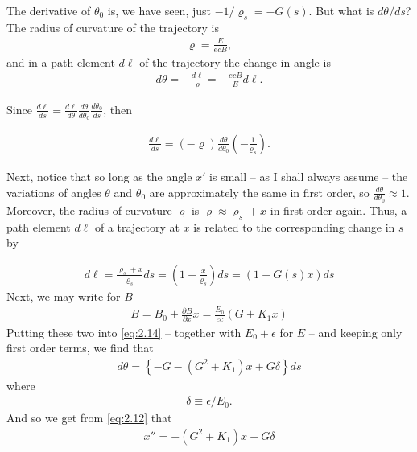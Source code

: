 The derivative of $\theta_0$ is, we have seen, just $-1/\varrho_s = -G(s)$. But what is $d\theta/ds$? The radius of curvature of the trajectory is
\begin{align} \label{eq:2.13}
	\varrho = \frac{E}{ecB},
\end{align}
and in a path element $d\ell$ of the trajectory the change in angle is
\begin{align}
	d\theta = -\frac{d\ell}{\varrho} = -\frac{ecB}{E}d\ell\label{eq:2.14}.
\end{align}

Since $\frac{d\ell}{ds} = \frac{d\ell}{d\theta}\frac{d\theta}{d\theta_0}\frac{d\theta_0}{ds}$, then

\begin{align*}
\frac{d\ell}{ds} = \left(-\varrho\right)\frac{d\theta}{d\theta_0}\left(-\frac{1}{\varrho_s}\right).
\end{align*}

Next, notice that so long as the angle $x'$ is small -- as I shall always assume -- the variations of angles $\theta$ and $\theta_0$ are approximately the same in first order,
so $\frac{d\theta}{d\theta_0} \approx 1$. Moreover, the radius of curvature $\varrho$ is $\varrho \approx \varrho_s + x$ in first order again. Thus, a path element $d\ell$ of a trajectory at
$x$ is related to the corresponding change in $s$ by

\begin{align}
	d\ell = \frac{\varrho_s + x}{\varrho_s} ds = \left(1+\frac{x}{\varrho_s}\right)ds = (1+G(s)x)ds\label{eq:2.15}
\end{align}
Next, we may write for $B$
\begin{align}
	B = B_0 + \frac{\partial B}{\partial x}x = \frac{E_0}{ec}(G+K_1x)\label{eq:2.16}
\end{align}
Putting these two into \eqref{eq:2.14} -- together with $E_0 + \epsilon$ for $E$ -- and keeping only first order terms, we find that
\begin{align*}
	d\theta = \left\{-G-(G^2+K_1)x + G\delta\right\}ds
\end{align*}
where
\begin{align*}
	\delta \equiv \epsilon / E_0.
\end{align*}
And so we get from \eqref{eq:2.12} that
\begin{align}\label{eq:2.17}
	x'' = -(G^ 2+K_1)x + G\delta
\end{align}

